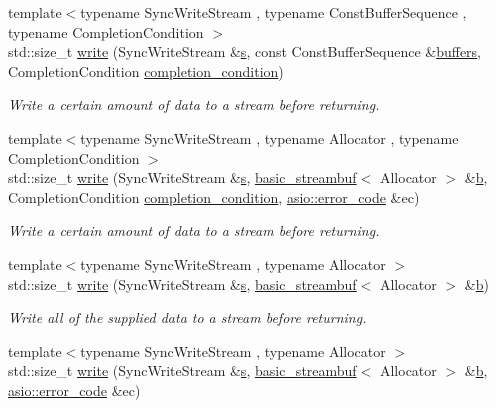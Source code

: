 \begin{DoxyCompactItemize}
{\footnotesize template$<$typename Sync\+Write\+Stream , typename Const\+Buffer\+Sequence , typename Completion\+Condition $>$ }\\std\+::size\+\_\+t \hyperlink{group__write_ga646f54905cf959c2c16f221a2e1c1ce7}{write} (Sync\+Write\+Stream \&\hyperlink{group__async__connect_ga31ab74b9ea6c77932dddd016cfc7920a}{s}, const Const\+Buffer\+Sequence \&\hyperlink{group__async__read_ga54dede45c3175148a77fe6635222c47d}{buffers}, Completion\+Condition \hyperlink{group__async__read_gae2e215d5013596cc2b385bb6c13fa518}{completion\+\_\+condition})
\begin{DoxyCompactList}\small\item\em Write a certain amount of data to a stream before returning. \end{DoxyCompactList}\item 
{\footnotesize template$<$typename Sync\+Write\+Stream , typename Allocator , typename Completion\+Condition $>$ }\\std\+::size\+\_\+t \hyperlink{group__write_ga393e12e427f89cb932c6a2bd800236fb}{write} (Sync\+Write\+Stream \&\hyperlink{group__async__connect_ga31ab74b9ea6c77932dddd016cfc7920a}{s}, \hyperlink{classasio_1_1basic__streambuf}{basic\+\_\+streambuf}$<$ Allocator $>$ \&\hyperlink{group__async__read_ga945a5c18fa77a9e2eba420f8f44b2a4f}{b}, Completion\+Condition \hyperlink{group__async__read_gae2e215d5013596cc2b385bb6c13fa518}{completion\+\_\+condition}, \hyperlink{classasio_1_1error__code}{asio\+::error\+\_\+code} \&ec)
\begin{DoxyCompactList}\small\item\em Write a certain amount of data to a stream before returning. \end{DoxyCompactList}\item 
{\footnotesize template$<$typename Sync\+Write\+Stream , typename Allocator $>$ }\\std\+::size\+\_\+t \hyperlink{group__write_ga85807d13da87adf48b62979f65f41152}{write} (Sync\+Write\+Stream \&\hyperlink{group__async__connect_ga31ab74b9ea6c77932dddd016cfc7920a}{s}, \hyperlink{classasio_1_1basic__streambuf}{basic\+\_\+streambuf}$<$ Allocator $>$ \&\hyperlink{group__async__read_ga945a5c18fa77a9e2eba420f8f44b2a4f}{b})
\begin{DoxyCompactList}\small\item\em Write all of the supplied data to a stream before returning. \end{DoxyCompactList}\item 
{\footnotesize template$<$typename Sync\+Write\+Stream , typename Allocator $>$ }\\std\+::size\+\_\+t \hyperlink{group__write_gaf72f7eddd7d4629ea2e2b7f5b7f355bc}{write} (Sync\+Write\+Stream \&\hyperlink{group__async__connect_ga31ab74b9ea6c77932dddd016cfc7920a}{s}, \hyperlink{classasio_1_1basic__streambuf}{basic\+\_\+streambuf}$<$ Allocator $>$ \&\hyperlink{group__async__read_ga945a5c18fa77a9e2eba420f8f44b2a4f}{b}, \hyperlink{classasio_1_1error__code}{asio\+::error\+\_\+code} \&ec)

\end{DoxyCompactItemize}
